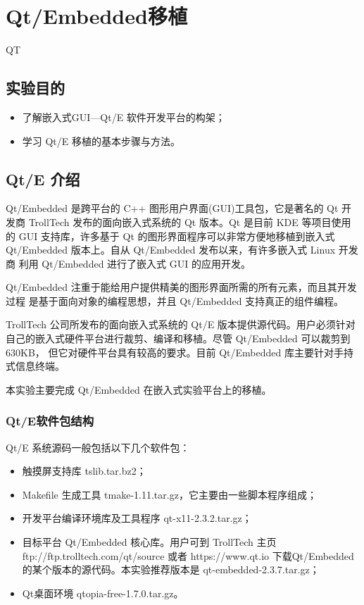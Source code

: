\chapter{Qt/Embedded移植}{QT}

\section{实验目的}
\begin{itemize}
  \item 了解嵌入式GUI---Qt/E 软件开发平台的构架；
  \item 学习 Qt/E 移植的基本步骤与方法。
\end{itemize}

\section{Qt/E 介绍}
Qt/Embedded 是跨平台的 C++ 图形用户界面(GUI)工具包，它是著名的 Qt 开发商
TrollTech 发布的面向嵌入式系统的 Qt 版本。Qt 是目前 KDE 等项目使用的 GUI
支持库，许多基于 Qt 的图形界面程序可以非常方便地移植到嵌入式
Qt/Embedded 版本上。自从 Qt/Embedded 发布以来，有许多嵌入式 Linux 开发商
利用 Qt/Embedded 进行了嵌入式 GUI 的应用开发。

Qt/Embedded 注重于能给用户提供精美的图形界面所需的所有元素，而且其开发过程
是基于面向对象的编程思想，并且 Qt/Embedded 支持真正的组件编程。

TrollTech 公司所发布的面向嵌入式系统的 Qt/E 版本提供源代码。用户必须针对
自己的嵌入式硬件平台进行裁剪、编译和移植。尽管 Qt/Embedded 可以裁剪到630KB，
但它对硬件平台具有较高的要求。目前 Qt/Embedded 库主要针对手持式信息终端。

本实验主要完成 Qt/Embedded 在嵌入式实验平台上的移植。
\subsection{Qt/E软件包结构}
Qt/E 系统源码一般包括以下几个软件包：
\begin{itemize}
    \item 触摸屏支持库 tslib.tar.bz2；
    \item Makefile 生成工具 tmake-1.11.tar.gz，它主要由一些脚本程序组成；
    \item 开发平台编译环境库及工具程序 qt-x11-2.3.2.tar.gz；
    \item 目标平台 Qt/Embedded 核心库。用户可到 TrollTech 主页
        ftp://ftp.trolltech.com/qt/source 或者 https://www.qt.io
        下载Qt/Embedded的某个版本的源代码。本实验推荐版本是
        qt-embedded-2.3.7.tar.gz；
    \item Qt桌面环境 qtopia-free-1.7.0.tar.gz。
\end{itemize}

